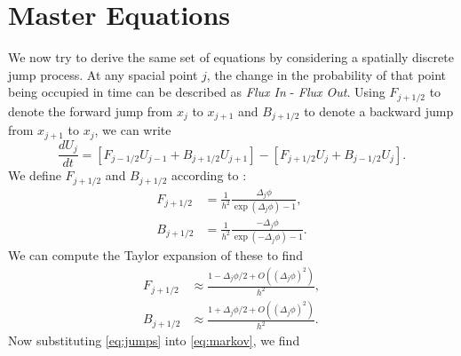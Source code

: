 \documentclass[reqno,11pt]{article}
\begin{document}
	\section{Master Equations}
		We now try to derive the same set of equations by considering a spatially discrete jump process.
		At any spacial point $j$, the change in the probability of that point being occupied in time can be described as \textit{Flux In} - \textit{Flux Out}.
		Using $F_{j+1/2}$ to denote the forward jump from $x_j$ to $x_{j+1}$ and $B_{j+1/2}$ to denote a backward jump from $x_{j+1}$ to $x_j$, we can write
		\begin{equation}
			\label{eq:markov}
			\frac{d U_j}{dt} = \left[ F_{j-1/2} U_{j-1} + B_{j+1/2} U_{j+1} \right] - \left[ F_{j+1/2} U_j + B_{j-1/2} U_j \right].
		\end{equation}
		We define $F_{j+1/2}$ and $B_{j+1/2}$ according to \cite{morton_mayers_2005}:
		\begin{equation*}
			\begin{aligned}
				F_{j+1/2} &= \frac{1}{h^2} \frac{\Delta_j \phi}{\exp ( \Delta_j \phi ) - 1}, \\
				B_{j+1/2} &= \frac{1}{h^2} \frac{- \Delta_j \phi}{\exp ( - \Delta_j \phi ) - 1}.
			\end{aligned}
		\end{equation*}
		We can compute the Taylor expansion of these to find
		\begin{equation}
			\label{eq:jumps}
			\begin{aligned}
				F_{j+1/2} &\approx \frac{1 - \Delta_j \phi / 2 + O \left( ( \Delta_j \phi )^2 \right)}{h^2}, \\
				B_{j+1/2} &\approx \frac{1 + \Delta_j \phi / 2 + O \left( ( \Delta_j \phi )^2 \right)}{h^2}.
			\end{aligned}
		\end{equation}
		Now substituting \eqref{eq:jumps} into \eqref{eq:markov}, we find
			
		
	
	
	
\end{document}
